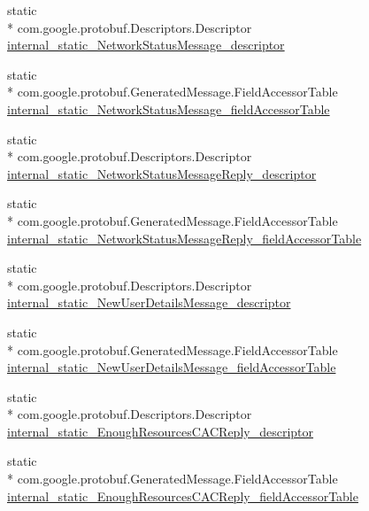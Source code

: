 \begin{DoxyCompactItemize}
\item 
static \\*
com.\+google.\+protobuf.\+Descriptors.\+Descriptor \hyperlink{classeu_1_1uloop_1_1messages_1_1UloopMessages_a1548c25b1878ff52b1c429efb4114b47}{internal\+\_\+static\+\_\+\+Network\+Status\+Message\+\_\+descriptor}
\item 
static \\*
com.\+google.\+protobuf.\+Generated\+Message.\+Field\+Accessor\+Table \hyperlink{classeu_1_1uloop_1_1messages_1_1UloopMessages_ad504a7f23c5c2472dbb3f0dfe4d5ecf2}{internal\+\_\+static\+\_\+\+Network\+Status\+Message\+\_\+field\+Accessor\+Table}
\item 
static \\*
com.\+google.\+protobuf.\+Descriptors.\+Descriptor \hyperlink{classeu_1_1uloop_1_1messages_1_1UloopMessages_a9a9bfeab2ecc83a915fbe551f1270789}{internal\+\_\+static\+\_\+\+Network\+Status\+Message\+Reply\+\_\+descriptor}
\item 
static \\*
com.\+google.\+protobuf.\+Generated\+Message.\+Field\+Accessor\+Table \hyperlink{classeu_1_1uloop_1_1messages_1_1UloopMessages_a714c29a2294a45a05d027ef6afa8b60f}{internal\+\_\+static\+\_\+\+Network\+Status\+Message\+Reply\+\_\+field\+Accessor\+Table}
\item 
static \\*
com.\+google.\+protobuf.\+Descriptors.\+Descriptor \hyperlink{classeu_1_1uloop_1_1messages_1_1UloopMessages_aa8e4a3407f3edb922e57c52f9a5f9ebe}{internal\+\_\+static\+\_\+\+New\+User\+Details\+Message\+\_\+descriptor}
\item 
static \\*
com.\+google.\+protobuf.\+Generated\+Message.\+Field\+Accessor\+Table \hyperlink{classeu_1_1uloop_1_1messages_1_1UloopMessages_acac2c9a7fd7c01c4deb1e5d69998d710}{internal\+\_\+static\+\_\+\+New\+User\+Details\+Message\+\_\+field\+Accessor\+Table}
\item 
static \\*
com.\+google.\+protobuf.\+Descriptors.\+Descriptor \hyperlink{classeu_1_1uloop_1_1messages_1_1UloopMessages_af9aa28de37b70f0216665c987c4b9ee7}{internal\+\_\+static\+\_\+\+Enough\+Resources\+C\+A\+C\+Reply\+\_\+descriptor}
\item 
static \\*
com.\+google.\+protobuf.\+Generated\+Message.\+Field\+Accessor\+Table \hyperlink{classeu_1_1uloop_1_1messages_1_1UloopMessages_a2ba2dbf4bfc8a06d95883aeb423ed5a8}{internal\+\_\+static\+\_\+\+Enough\+Resources\+C\+A\+C\+Reply\+\_\+field\+Accessor\+Table}

\end{DoxyCompactItemize}

